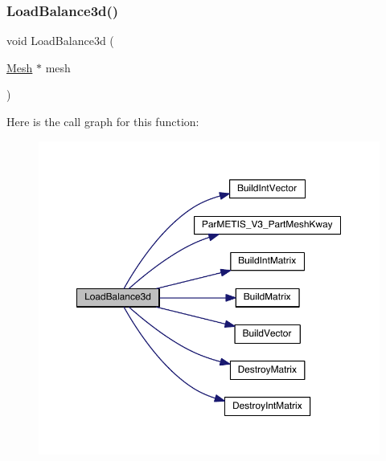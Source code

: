 \subsubsection{\texorpdfstring{Load\+Balance3d()}{LoadBalance3d()}}
{\footnotesize\ttfamily void Load\+Balance3d (\begin{DoxyParamCaption}\item[{\hyperlink{a00557_aeffbe0891ab73a4d8964c9cb7978426e}{Mesh} $\ast$}]{mesh }\end{DoxyParamCaption})}

Here is the call graph for this function\+:\nopagebreak
\begin{figure}[H]
\begin{center}
\leavevmode
\includegraphics[width=350pt]{a00587_a004c52e87250e61b258755469b25bbe9_cgraph}
\end{center}
\end{figure}
